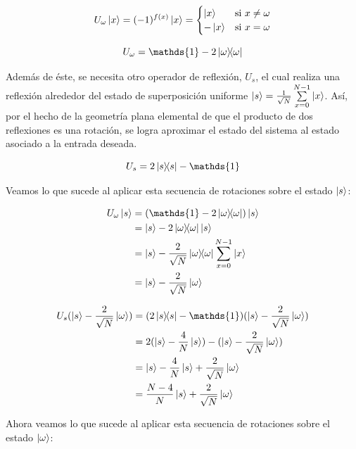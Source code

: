 \begin{equation}
    U_\omega \ket{x} = (-1)^{f(x)} \ket{x} =
    \begin{cases}
        \ket{x} & \text{si } x \neq \omega \\
        - \ket{x} & \text{si } x = \omega
    \end{cases}
\end{equation}

\begin{equation}
U_\omega = \mathds{1} - 2 \ketbra{\omega}{\omega}
\end{equation}

Además de éste, se necesita otro operador de reflexión, $U_s$, el cual realiza una reflexión alrededor del estado de superposición uniforme $\ket{s} = \frac{1}{\sqrt{N}} \sum\limits_{x=0}^{N-1} \ket{x}$. Así, por el hecho de la geometría plana elemental de que el producto de dos reflexiones es una rotación, se logra aproximar el estado del sistema al estado asociado a la entrada deseada.

\begin{equation}
U_s = 2 \ketbra{s}{s} - \mathds{1}
\end{equation}

Veamos lo que sucede al aplicar esta secuencia de rotaciones sobre el estado $\ket{s}$:

\begin{align*}
    U_\omega \ket{s}
    &= (\mathds{1} - 2 \ketbra{\omega}{\omega}) \ket{s} \\
    &= \ket{s} - 2 \ketbra{\omega}{\omega} \ket{s} \\
    &= \ket{s} - \frac{2}{\sqrt{N}} \ketbra{\omega}{\omega} \sum\limits_{x=0}^{N-1} \ket{x} \\
    &= \ket{s} - \frac{2}{\sqrt{N}} \ket{\omega}
\end{align*}

\begin{align*}
    U_s (\ket{s} - \frac{2}{\sqrt{N}} \ket{\omega})
    &= (2 \ketbra{s}{s} - \mathds{1}) (\ket{s} - \frac{2}{\sqrt{N}} \ket{\omega}) \\
    &= 2 (\ket{s} - \frac{4}{N} \ket{s}) - (\ket{s} - \frac{2}{\sqrt{N}} \ket{\omega}) \\
    &= \ket{s} - \frac{4}{N} \ket{s} + \frac{2}{\sqrt{N}} \ket{\omega} \\
    &= \frac{N-4}{N} \ket{s} + \frac{2}{\sqrt{N}} \ket{\omega}
\end{align*}

Ahora veamos lo que sucede al aplicar esta secuencia de rotaciones sobre el estado $\ket{\omega}$:

